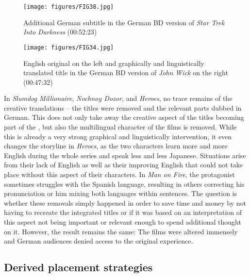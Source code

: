 \begin{figure}
\texttt{[image: figures/FIG38.jpg]}
\caption{Additional German subtitle in the German BD version of \textit{Star Trek Into Darkness} (00:52:23)}
\label{fig:FIG38}
\end{figure}

\begin{figure}
\texttt{[image: figures/FIG34.jpg]}
\caption{English original on the left and graphically and linguistically translated title in the German BD version of \textit{John Wick} on the right (00:47:32)}
\label{fig:FIG34}
\end{figure}
\newpage 
In \textit{Slumdog Millionaire}, \textit{Nochnoy Dozor,} and \textit{Heroes}, no trace remains of the creative translations – the titles were removed and the relevant parts dubbed in German. This does not only take away the creative aspect of the titles becoming part of the , but also the multilingual character of the films is removed. While this is already a very strong graphical and linguistically intervention, it even changes the storyline in \textit{Heroes}, as the two characters learn more and more English during the whole series and speak less and less Japanese. Situations arise from their lack of English as well as their improving English that could not take place without this aspect of their characters. In \textit{Man on Fire}, the protagonist sometimes struggles with the Spanish language, resulting in others correcting his pronunciation or him mixing both languages within sentences. The question is whether these removals simply happened in order to save time and money by not having to recreate the integrated titles or if it was based on an interpretation of this aspect not being important or relevant enough to spend additional thought on it. However, the result remains the same: The films were altered immensely and German audiences denied access to the original experience.

\subsection{Derived placement strategies}\label{sec:4.2.4}


